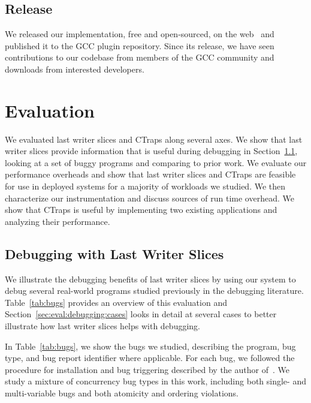 \documentclass[preprint,9pt]{sigplanconf}
\newcommand{\ctraps}{CTraps\xspace}
\begin{document}
\subsection{Release}
We released our implementation, free and open-sourced, on the
web~\cite{ctrapsrelease} and published it to the GCC plugin repository.
Since its release, we have seen contributions to our codebase from members of
the GCC community and downloads from interested developers.

\section{Evaluation}
\label{sec:eval}
We evaluated last writer slices and \ctraps along several axes.  We show that
last writer slices provide information that is useful during debugging in
Section~\ref{sec:eval:debugging}, looking at a set of buggy programs and
comparing to prior work.  We evaluate our performance overheads and
show that last writer slices and \ctraps are feasible for use in deployed
systems for a majority of workloads we studied.  We then characterize our
instrumentation and discuss sources of run time overhead.   We
show that \ctraps is useful by implementing two existing applications and
analyzing their performance.    

\subsection{Debugging with Last Writer Slices}
\label{sec:eval:debugging}

We illustrate the debugging benefits of last writer slices by using our system
to debug several real-world programs studied previously in the debugging
literature.  Table~\ref{tab:bugs} provides an overview of this evaluation and
Section~\ref{sec:eval:debugging:cases} looks in detail at several cases to 
better illustrate how last writer slices helps with debugging.

In Table~\ref{tab:bugs}, we show the bugs we studied, describing the program,
bug type, and bug report identifier where applicable.  For each bug, we
followed the procedure for installation and bug triggering described by the
author of~\cite{concurrencybugs}.  We study a mixture of concurrency bug types
in this work, including both single- and multi-variable bugs and both atomicity
and ordering violations.
\end{document}

